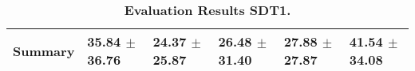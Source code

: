 \begin{table}[htb]
{\begin{tabular}{llllll}
\midrule
\textbf{Summary                                  } &                  \phantom{0}35.84 $\pm$ 36.76 &                      \phantom{0}24.37 $\pm$ 25.87 &                  \phantom{0}26.48 $\pm$ 31.40 &                  \phantom{0}27.88 $\pm$ 27.87 &            \phantom{0}41.54 $\pm$ 34.08 \\
\bottomrule
\end{tabular}%
}
\caption{\textbf{Evaluation Results SDT1.}}
\label{tab:eval-results}
\end{table}


